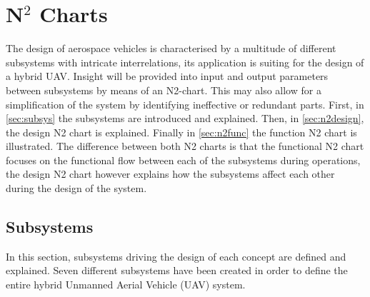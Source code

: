 \chapter{N$^2$ Charts}
\label{ch:n2_char}

The design of aerospace vehicles is characterised by a multitude of different subsystems with intricate interrelations, its application is suiting for the design of a hybrid UAV. Insight will be provided into input and output parameters between subsystems by means of an N2-chart. This may also allow for a simplification of the system by identifying ineffective or redundant parts. First, in \autoref{sec:subsys} the subsystems are introduced and explained. Then, in \autoref{sec:n2design}, the design N2 chart is explained. Finally in \autoref{sec:n2func} the function N2 chart is illustrated. The difference between both N2 charts is that the functional N2 chart focuses on the functional flow between each of the subsystems during operations, the design N2 chart however explains how the subsystems affect each other during the design of the system. 

\section{Subsystems}
\label{sec:subsys}

In this section, subsystems driving the design of each concept are defined and explained. Seven different subsystems have been created in order to define the entire hybrid Unmanned Aerial Vehicle (UAV) system. \newline

